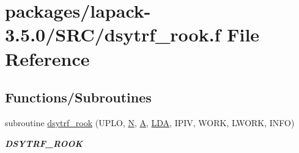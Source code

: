 \hypertarget{dsytrf__rook_8f}{}\section{packages/lapack-\/3.5.0/\+S\+R\+C/dsytrf\+\_\+rook.f File Reference}
\label{dsytrf__rook_8f}
\subsection*{Functions/\+Subroutines}
\begin{DoxyCompactItemize}
\item 
subroutine \hyperlink{group__doubleSYcomputational_ga346980cb5db946c84f7cd7288d181b89}{dsytrf\+\_\+rook} (U\+P\+L\+O, \hyperlink{polmisc_8c_a0240ac851181b84ac374872dc5434ee4}{N}, \hyperlink{classA}{A}, \hyperlink{example__user_8c_ae946da542ce0db94dced19b2ecefd1aa}{L\+D\+A}, I\+P\+I\+V, W\+O\+R\+K, L\+W\+O\+R\+K, I\+N\+F\+O)
\begin{DoxyCompactList}\small\item\em {\bfseries D\+S\+Y\+T\+R\+F\+\_\+\+R\+O\+O\+K} \end{DoxyCompactList}\end{DoxyCompactItemize}
